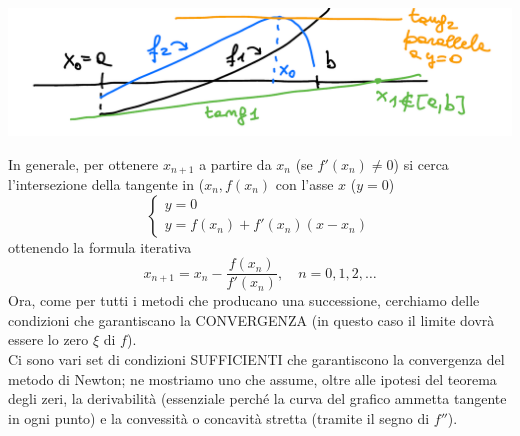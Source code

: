 \begin{center}
    \includegraphics[scale=0.5]{foto/pagina7}
\end{center}
In generale, per ottenere $x_{n+1}$ a partire da $x_n$ (se $f'(x_n)\neq 0$) si cerca l'intersezione della tangente in ($x_n,f(x_n)$ con l'asse $x$ ($y=0$)\\
\[ \begin{cases}
        y=0\\
        y=f(x_n)+f'(x_n)(x-x_n)
\end{cases} \]
ottenendo la formula iterativa\\
\[ x_{n+1}=x_n-\frac{f(x_n)}{f'(x_n)}, \quad n=0,1,2,\dotso \]
Ora, come per tutti i metodi che producano una successione, cerchiamo delle condizioni che garantiscano la CONVERGENZA (in questo caso il limite dovrà essere lo zero $\xi$ di $f$).\\
Ci sono vari set di condizioni SUFFICIENTI che garantiscono la convergenza del metodo di Newton; ne mostriamo uno che assume, oltre alle ipotesi del teorema degli zeri, la derivabilità (essenziale perché la curva del grafico ammetta tangente in ogni punto) e la convessità o concavità stretta (tramite il segno di $f''$).

